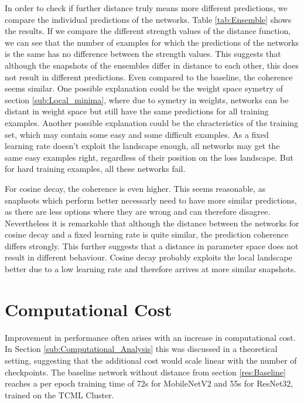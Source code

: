 In order to check if further distance truly means more different predictions, we
compare the individual predictions of the networks. Table \ref{tab:Ensemble}
shows the results. If we compare the different strength values of the distance
function, we can see that the number of examples for which the predictions of
the networks is the same has no difference between the strength values. This
suggests that although the snapshots of the ensembles differ in distance to each
other, this does not result in different predictions. Even compared to the
baseline, the coherence seems similar. One possible explanation could be the
weight space symetry of section \ref{sub:Local_minima}, where due to symetry in
weights, networks can be distant in weight space but still have the same
predictions for all training examples. Another possible explanation could be the
chracteristics of the training set, which may contain some easy and some
difficult examples. As a fixed learning rate doesn't exploit the landscape
enough, all networks may get the same easy examples right, regardless of their
position on the loss landscape. But for hard training examples, all these
networks fail.


For cosine decay, the coherence is even higher. This seems reasonable, as
snaphsots which perform better necessarly need to have more similar predictions,
as there are less options where they are wrong and can therefore disagree.
Nevertheless it is remarkable that although the distance between the networks
for cosine decay and a fixed learning rate is quite similar, the prediction
coherence differs strongly. This further suggests that a distance in parameter
space does not result in different behaviour. Cosine decay probably exploits the
local landscape better due to a low learning rate and therefore arrives at more
similar snapshots.


\section{Computational Cost}\label{Res:Computational_cost}

Improvement in performance often arises with an increase in computational cost.
In Section \ref{sub:Computational_Analysis} this was discussed in a theoretical
setting, suggesting that the additional cost would scale linear with the number
of checkpoints. The baseline network without distance from section
\ref{res:Baseline} reaches a per epoch training time of 72s for MobileNetV2 and
55s for ResNet32, trained on the TCML Cluster. 


